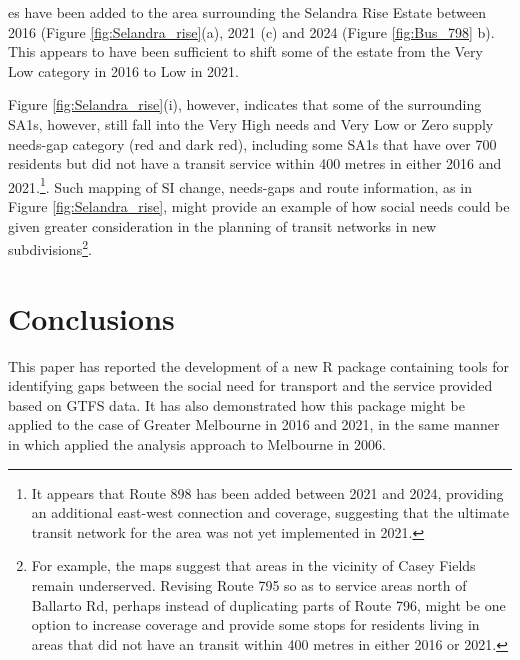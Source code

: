 \documentclass[preprint, 3p,
authoryear]{elsarticle} %
\begin{document}
es have been added to the area surrounding the
Selandra Rise Estate between 2016 (Figure \ref{fig:Selandra_rise}(a),
2021 (c) and 2024 (Figure \ref{fig:Bus_798} b). This appears to have
been sufficient to shift some of the estate from the Very Low category
in 2016 to Low in 2021.

Figure \ref{fig:Selandra_rise}(i), however, indicates that some of the
surrounding SA1s, however, still fall into the Very High needs and Very
Low or Zero supply needs-gap category (red and dark red), including some
SA1s that have over 700 residents but did not have a transit service
within 400 metres in either 2016 and 2021.\footnote{It appears that
  Route 898 has been added between 2021 and 2024, providing an
  additional east-west connection and coverage, suggesting that the
  ultimate transit network for the area was not yet implemented in 2021.}.
Such mapping of SI change, needs-gaps and route information, as in
Figure \ref{fig:Selandra_rise}, might provide an example of how social
needs could be given greater consideration in the planning of transit
networks in new subdivisions\footnote{For example, the maps suggest that
  areas in the vicinity of Casey Fields remain underserved. Revising
  Route 795 so as to service areas north of Ballarto Rd, perhaps instead
  of duplicating parts of Route 796, might be one option to increase
  coverage and provide some stops for residents living in areas that did
  not have an transit within 400 metres in either 2016 or 2021.}.

\section{Conclusions}\label{conclusions}

This paper has reported the development of a new R package containing
tools for identifying gaps between the social need for transport and the
service provided based on GTFS data. It has also demonstrated how this
package might be applied to the case of Greater Melbourne in 2016 and
2021, in the same manner in which \citet{currie2010identifying} applied
the analysis approach to Melbourne in 2006.
\end{document}
